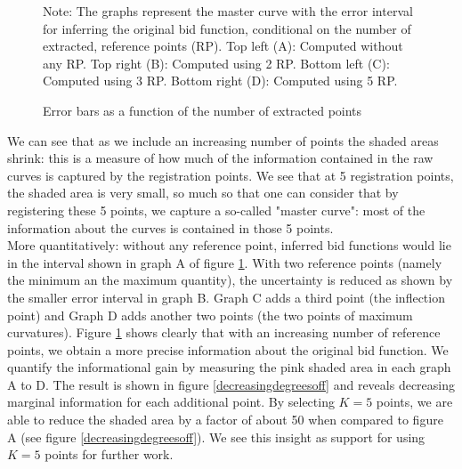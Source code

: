 \begin{figure}[!ht]
\begin{center}
{}
\caption{Error bars as a function of the number of extracted points}
\label{errorbarsasfunction}
\end{center}
{ \small Note: The graphs represent the master curve with the error interval for inferring the original bid function, conditional on the number of extracted, reference  points (RP). Top left (A): Computed without any RP. Top right (B): Computed using 2 RP. Bottom left (C): Computed using 3 RP. Bottom right (D): Computed using 5 RP. } 
\end{figure}

We can see that as we include an increasing number of points the shaded areas shrink: this is a measure of how much of the information contained in the raw curves is captured by the registration points. We see that at 5 registration points, the shaded area is very small, so much so that one can consider that by registering these 5 points, we capture a so-called "master curve": most of the information about the curves is contained in those 5 points.\\

More quantitatively: without any reference point, inferred bid functions would lie in the interval shown in graph A of figure \ref{errorbarsasfunction}. With two reference points (namely the minimum an the maximum quantity), the uncertainty is reduced as shown by the smaller error interval in graph B. Graph C adds a third point (the inflection point) and Graph D adds another two points (the two points of maximum curvatures). Figure \ref{errorbarsasfunction} shows clearly that with an increasing number of reference points, we obtain a more precise information about the original bid function. We quantify the informational gain by measuring the pink shaded area in each graph A to D. The result is shown in figure \ref{decreasingdegreesoff} and reveals decreasing marginal information for each additional point. By selecting $K=5$ points, we are able to reduce the shaded area by a factor of about 50 when compared to figure A (see figure \ref{decreasingdegreesoff}). We see this insight as support for using $K=5$ points for further work. \\

